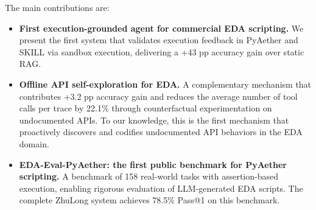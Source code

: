The main contributions are:
\begin{itemize}
    \item \textbf{First execution-grounded agent for commercial EDA scripting.} We present the first system that validates execution feedback in PyAether and SKILL via sandbox execution, delivering a +43 pp accuracy gain over static RAG.
    \item \textbf{Offline API self-exploration for EDA.} A complementary mechanism that contributes +3.2 pp accuracy gain and reduces the average number of tool calls per trace by 22.1\% through counterfactual experimentation on undocumented APIs. To our knowledge, this is the first mechanism that proactively discovers and codifies undocumented API behaviors in the EDA domain.
    \item \textbf{EDA-Eval-PyAether: the first public benchmark for PyAether scripting.} A benchmark of 158 real-world tasks with assertion-based execution, enabling rigorous evaluation of LLM-generated EDA scripts. The complete ZhuLong system achieves 78.5\% Pass@1 on this benchmark.
\end{itemize}